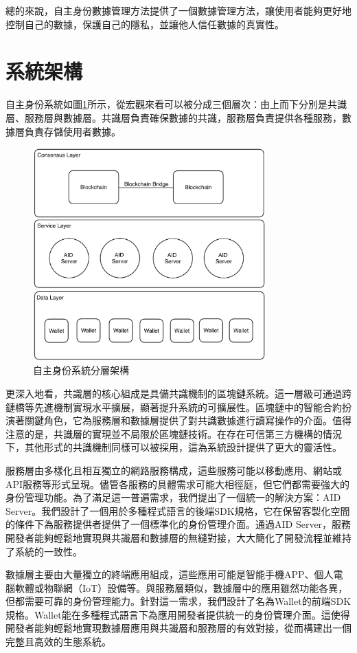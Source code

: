 總的來說，自主身份數據管理方法提供了一個數據管理方法，讓使用者能夠更好地控制自己的數據，保護自己的隱私，並讓他人信任數據的真實性。\newpage
\section{系統架構}
自主身份系統如圖\ref{fig:aid-layers}所示，從宏觀來看可以被分成三個層次：由上而下分別是共識層、服務層與數據層。共識層負責確保數據的共識，服務層負責提供各種服務，數據層負責存儲使用者數據。
\begin{figure}
  \centering
  \includegraphics[width=0.8\textwidth]{figures/aidLayers.png}
  \caption{自主身份系統分層架構}
  \label{fig:aid-layers}
\end{figure}

更深入地看，共識層的核心組成是具備共識機制的區塊鏈系統。這一層級可通過跨鏈橋等先進機制實現水平擴展，顯著提升系統的可擴展性。區塊鏈中的智能合約扮演著關鍵角色，它為服務層和數據層提供了對共識數據進行讀寫操作的介面。值得注意的是，共識層的實現並不局限於區塊鏈技術。在存在可信第三方機構的情況下，其他形式的共識機制同樣可以被採用，這為系統設計提供了更大的靈活性。

服務層由多樣化且相互獨立的網路服務構成，這些服務可能以移動應用、網站或API服務等形式呈現。儘管各服務的具體需求可能大相徑庭，但它們都需要強大的身份管理功能。為了滿足這一普遍需求，我們提出了一個統一的解決方案：AID Server。我們設計了一個用於多種程式語言的後端SDK規格，它在保留客製化空間的條件下為服務提供者提供了一個標準化的身份管理介面。通過AID Server，服務開發者能夠輕鬆地實現與共識層和數據層的無縫對接，大大簡化了開發流程並維持了系統的一致性。

數據層主要由大量獨立的終端應用組成，這些應用可能是智能手機APP、個人電腦軟體或物聯網（IoT）設備等。與服務層類似，數據層中的應用雖然功能各異，但都需要可靠的身份管理能力。針對這一需求，我們設計了名為Wallet的前端SDK規格。Wallet能在多種程式語言下為應用開發者提供統一的身份管理介面。這使得開發者能夠輕鬆地實現數據層應用與共識層和服務層的有效對接，從而構建出一個完整且高效的生態系統。

